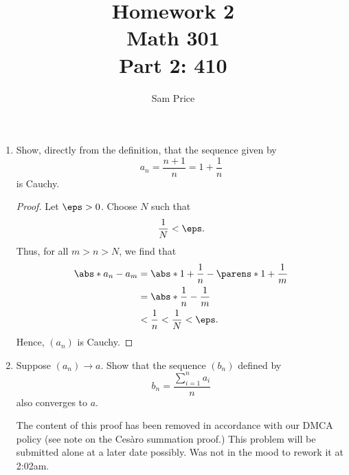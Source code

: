 \documentclass{article}
\author{Sam Price}
\title{Homework 2\\\Large{Math 301}\\\large{Part 2: 4\textendash{}10}}
\begin{document}
\maketitle


\begin{enumerate}
%
%
%



  \item Show, directly from the definition, that the sequence given by
        \[
        a_{n} = \frac{n + 1}{n} = 1 + \frac{1}{n}
        \]
        is Cauchy.\\

        \begin{proof}
           Let $\eps > 0$. Choose $N$ such that
           \[
           \frac{1}{N} < \eps.
           \]
           Thus, for all $m > n > N$, we find that
           \begin{align*}
           \abs*{a_{n} - a_{m}} &= \abs*{1 + \frac{1}{n} - \parens*{1 + \frac{1}{m}}}\\
           &= \abs*{\frac{1}{n} - \frac{1}{m}}\\ &< \frac{1}{n} < \frac{1}{N} < \eps.
           \end{align*}
           Hence, $(a_{n})$ is Cauchy.
        \end{proof}

  \item Suppose $(a_{n}) \to a$. Show that the sequence $(b_{n})$ defined by
        \[
        b_{n} = \frac{\sum_{i = 1}^{n}a_{i}}{n}
        \]
        also converges to $a$.

        The content of this proof has been removed in accordance with our DMCA policy (see note on the Ces\`aro summation proof.)
        This problem will be submitted alone at a later date possibly. Was not in the mood to rework it at 2:02am.


\end{enumerate}
\end{document}
